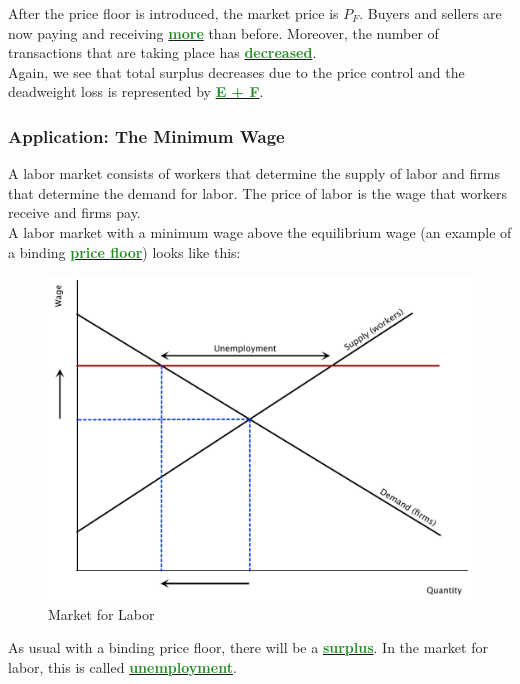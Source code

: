 \documentclass[11pt]{article}\usepackage[]{graphicx}\usepackage[]{color}
\theoremstyle{definition}
\newcommand{\dd}[1]{{\underline{\textbf{\textcolor{ForestGreen}{#1}}}}}
\begin{document}
	
	After the price floor is introduced, the market price is $P_F$. Buyers and sellers are now paying and receiving \dd{more} than before. Moreover, the number of transactions that are taking place has \dd{decreased}.
	\\
	
	Again, we see that total surplus decreases due to the price control and the deadweight loss is represented by \dd{E + F}.
	\\
	
	\subsubsection*{Application: The Minimum Wage}
	
	
	A labor market consists of workers that determine the supply of labor and firms that determine the demand for labor. The price of labor is the wage that workers receive and firms pay. 
	\\
	
	A labor market with a minimum wage above the equilibrium wage (an example of a binding \dd{price floor}) looks like this:
	
		\begin{figure}[H]
			\centering
			\includegraphics[scale=.40]{plot39.pdf}
			\caption{Market for Labor}
		\end{figure}
		
	
	As usual with a binding price floor, there will be a \dd{surplus}. In the market for labor, this is called \dd{unemployment}.
\end{document}
